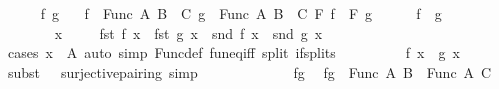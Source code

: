 \begin{isabellebody}
\ \ \ \ \isamarkupfalse%
\ f\ g\ \isamarkupfalse%
\ {\isacharasterisk}{\kern0pt}{\isacharcolon}{\kern0pt}\ {\isachardoublequoteopen}f\ {\isasymin}\ Func\ A\ {\isacharparenleft}{\kern0pt}B\ {\isasymtimes}\ C{\isacharparenright}{\kern0pt}{\isachardoublequoteclose}\ {\isachardoublequoteopen}g\ {\isasymin}\ Func\ A\ {\isacharparenleft}{\kern0pt}B\ {\isasymtimes}\ C{\isacharparenright}{\kern0pt}{\isachardoublequoteclose}\ {\isachardoublequoteopen}{\isacharquery}{\kern0pt}F\ f\ {\isacharequal}{\kern0pt}\ {\isacharquery}{\kern0pt}F\ g{\isachardoublequoteclose}\isanewline
\ \ \ \ \isamarkupfalse%
\ {\isachardoublequoteopen}f\ {\isacharequal}{\kern0pt}\ g{\isachardoublequoteclose}\isanewline
\ \ \ \ \isamarkupfalse%
\isanewline
\ \ \ \ \ \ \isamarkupfalse%
\ x\ \isamarkupfalse%
\ {\isacharasterisk}{\kern0pt}\ \isamarkupfalse%
\ {\isachardoublequoteopen}fst\ {\isacharparenleft}{\kern0pt}f\ x{\isacharparenright}{\kern0pt}\ {\isacharequal}{\kern0pt}\ fst\ {\isacharparenleft}{\kern0pt}g\ x{\isacharparenright}{\kern0pt}\ {\isasymand}\ snd\ {\isacharparenleft}{\kern0pt}f\ x{\isacharparenright}{\kern0pt}\ {\isacharequal}{\kern0pt}\ snd\ {\isacharparenleft}{\kern0pt}g\ x{\isacharparenright}{\kern0pt}{\isachardoublequoteclose}\isanewline
\ \ \ \ \ \ \ \ \isamarkupfalse%
\ {\isacharparenleft}{\kern0pt}cases\ {\isachardoublequoteopen}x\ {\isasymin}\ A{\isachardoublequoteclose}{\isacharparenright}{\kern0pt}\ {\isacharparenleft}{\kern0pt}auto\ simp{\isacharcolon}{\kern0pt}\ Func{\isacharunderscore}{\kern0pt}def\ fun{\isacharunderscore}{\kern0pt}eq{\isacharunderscore}{\kern0pt}iff\ split{\isacharcolon}{\kern0pt}\ if{\isacharunderscore}{\kern0pt}splits{\isacharparenright}{\kern0pt}\isanewline
\ \ \ \ \ \ \isamarkupfalse%
\ \isamarkupfalse%
\ {\isachardoublequoteopen}f\ x\ {\isacharequal}{\kern0pt}\ g\ x{\isachardoublequoteclose}\ \isamarkupfalse%
\ {\isacharparenleft}{\kern0pt}subst\ {\isacharparenleft}{\kern0pt}{}\ {}{\isacharparenright}{\kern0pt}\ surjective{\isacharunderscore}{\kern0pt}pairing{\isacharparenright}{\kern0pt}\ simp\isanewline
\ \ \ \ \isamarkupfalse%
\isanewline
\ \ \isamarkupfalse%
\isanewline
\ \ \ \ \isamarkupfalse%
\ fg\ \isamarkupfalse%
\ {\isachardoublequoteopen}fg\ {\isasymin}\ Func\ A\ B\ {\isasymtimes}\ Func\ A\ C{\isachardoublequoteclose}\isanewline
\ \ \ \ \isamarkupfalse%

\end{isabellebody}
